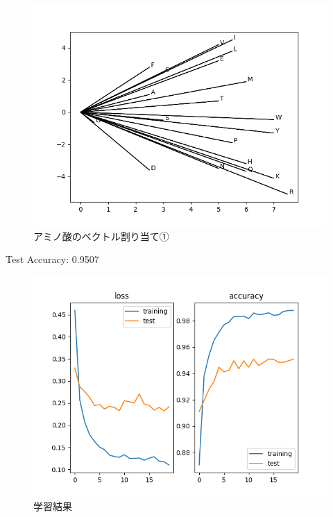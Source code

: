 \documentclass[dvipdfmx]{beamer}
\begin{document}
  \begin{frame}
    \begin{figure}[H]
      \centering
      \includegraphics[keepaspectratio, scale=0.6]{images/amino_vector.png}
      \caption{アミノ酸のベクトル割り当て①}
      \label{fig:amino_vector}
    \end{figure}
  \end{frame}

  \begin{frame}
    Test Accuracy: 0.9507
    \begin{figure}
      \centering
      \includegraphics[keepaspectratio, scale=0.6]{images/train_fnn_amino_img.png}
      \caption{学習結果}
      \label{fig:result_amino_img}
    \end{figure}
  \end{frame}
\end{document}
